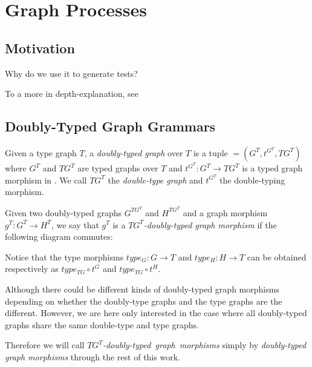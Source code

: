 \chapter{Graph Processes}

\section{Motivation}

Why do we use it to generate tests?

To a more in depth-explanation, see~\cite{Ribeiro1996, Corradini2014} 

\section{Doubly-Typed Graph Grammars}

\begin{definition} Given a type graph $T$, a \emph{doubly-typed graph} \doublyTypedGraph{} over $T$ is a tuple \doublyTypedGraph $= \left(G^T, t^{G^T},TG^T\right)$ where $G^T$ and $TG^T$ are typed graphs over $T$ and \mbox{$t^{G^T} : G^T \rightarrow TG^T$} is a typed graph morphism in \typedGraphCategory{}. We call $TG^T$ the \emph{double-type graph} and $t^{G^T}$ the double-typing morphism.

\end{definition}

\begin{definition}
  Given two doubly-typed graphs $G^{TG^T}$ and $H^{TG^T}$ and a graph morphism $g^T : G^T \rightarrow H^T$, we say that $g^T$ is a \emph{$TG^T$-doubly-typed graph morphism} if the following diagram commutes:

\end{definition}

Notice that the type morphisms $type_G : G \rightarrow T$ and $type_H : H \rightarrow T$ can be obtained respectively as $type_{TG} \circ t^G$ and $type_{TG} \circ t^H$.

\begin{remark} Although there could be different kinds of doubly-typed graph morphisms depending on whether the doubly-type graphs and the type graphs are the different. However, we are here only interested in the case where all doubly-typed graphs share the same double-type and type graphs. 
  
Therefore we will call \mbox{\emph{$TG^T$-doubly-typed graph morphisms}} simply by \emph{doubly-typed graph morphisms} through the rest of this work.

\end{remark}

